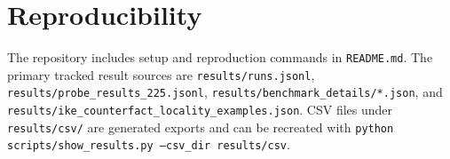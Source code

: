 \documentclass[11pt]{article}
\begin{document}
\section{Reproducibility}

The repository includes setup and reproduction commands in \texttt{README.md}. The primary tracked result sources are \texttt{results/runs.jsonl}, \texttt{results/probe\_results\_225.jsonl}, \texttt{results/benchmark\_details/*.json}, and \texttt{results/ike\_counterfact\_locality\_examples.json}. CSV files under \texttt{results/csv/} are generated exports and can be recreated with \texttt{python scripts/show\_results.py --csv\_dir results/csv}.
\end{document}
